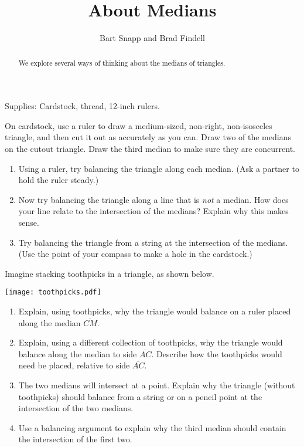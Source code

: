 \documentclass[nooutcomes]{ximera}
\title{About Medians}
\author{Bart Snapp and Brad Findell}
\begin{document}
\begin{abstract}
We explore several ways of thinking about the medians of triangles.  
\end{abstract}
\maketitle

\begin{teachingnote}
Supplies:  Cardstock, thread, 12-inch rulers.
\end{teachingnote}



\begin{problem}  
On cardstock, use a ruler to draw a medium-sized, non-right, non-isosceles triangle, and then cut it out as accurately as you can.  Draw two of the medians on the cutout triangle.  Draw the third median to make sure they are concurrent.  
\begin{enumerate}
\item Using a ruler, try balancing the triangle along each median.  (Ask a partner to hold the ruler steady.)  
\item Now try balancing the triangle along a line that is \emph{not} a median.  How does your line relate to the intersection of the medians?  Explain why this makes sense.  
\item Try balancing the triangle from a string at the intersection of the medians.  (Use the point of your compass to make a hole in the cardstock.)
\end{enumerate}

\end{problem}

\begin{problem}
Imagine stacking toothpicks in a triangle, as shown below.  

\begin{image}
\texttt{[image: toothpicks.pdf]}
\end{image}

\begin{enumerate}
\item Explain, using toothpicks, why the triangle would balance on a ruler placed along the median $\overline{CM}$.  
\vfill
\newpage 

\item Explain, using a different collection of toothpicks, why the triangle would balance along the median to side $\overline{AC}$.  Describe how the toothpicks would need be placed, relative to side $\overline{AC}$.
\vfill

\item The two medians will intersect at a point.  Explain why the triangle (without toothpicks) should balance from a string or on a pencil point at the intersection of the two medians.  
\vfill

\item Use a balancing argument to explain why the third median should contain the intersection of the first two.  
\vfill
\end{enumerate}
\end{problem}
\end{document}
